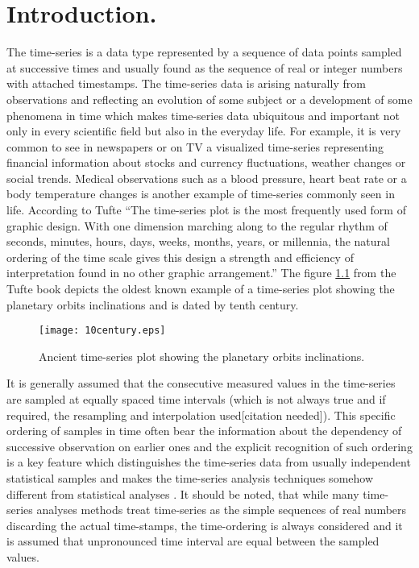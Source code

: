 \chapter{Introduction.}
The time-series is a data type represented by a sequence of data points sampled at successive times and usually found as the sequence of real or integer numbers with attached timestamps. The time-series data is arising naturally from observations and reflecting an evolution of some subject or a development of some phenomena in time which makes time-series data ubiquitous and important not only in every scientific field but also in the everyday life. For example, it is very common to see in newspapers or on TV a visualized time-series representing financial information about stocks and currency fluctuations, weather changes or social trends. Medical observations such as a blood pressure, heart beat rate or a body temperature changes is another example of time-series commonly seen in life. According to Tufte \cite{citeulike:1454223} ``The time-series plot is the most frequently used form of graphic design. With one dimension marching along to the regular rhythm of seconds, minutes, hours, days, weeks, months, years, or millennia, the natural ordering of the time scale gives this design a strength and efficiency of interpretation found in no other graphic arrangement.'' The figure \ref{fig:10century} from the Tufte book depicts the oldest known example of a time-series plot showing the planetary orbits inclinations and is dated by tenth century.
\begin{figure}[tbp]
   \centering
   \texttt{[image: 10century.eps]}
   \caption{Ancient time-series plot showing the planetary orbits inclinations.}
   \label{fig:10century}
\end{figure} 
It is generally assumed that the consecutive measured values in the time-series are sampled at equally spaced time intervals (which is not always true and if required, the resampling and interpolation used[citation needed]). This specific ordering of samples in time often bear the information about the dependency of successive observation on earlier ones and the explicit recognition of such ordering is a key feature which distinguishes the time-series data from usually independent statistical samples and makes the time-series analysis techniques somehow different from statistical analyses \cite{citeulike:3989988}. It should be noted, that while many time-series analyses methods treat time-series as the simple sequences of real numbers discarding the actual time-stamps, the time-ordering is always considered and it is assumed that unpronounced time interval are equal between the sampled values.

